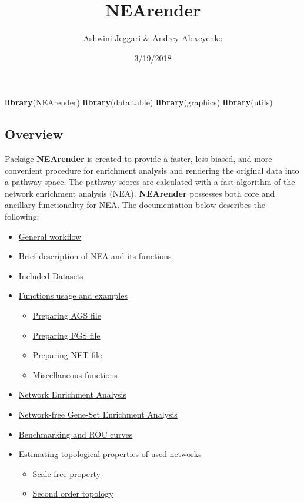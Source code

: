 \documentclass[]{article}
\title{NEArender}
\author{Ashwini Jeggari \& Andrey Alexeyenko}
\date{3/19/2018}
\newenvironment{Shaded}{\begin{snugshade}}{\end{snugshade}}
\newcommand{\KeywordTok}[1]{\textcolor[rgb]{0.13,0.29,0.53}{\textbf{#1}}}
\newcommand{\NormalTok}[1]{#1}
\providecommand{\tightlist}{%
  \setlength{\itemsep}{0pt}\setlength{\parskip}{0pt}}
\begin{document}
\maketitle

\begin{Shaded}
\begin{Highlighting}[]
\KeywordTok{library}\NormalTok{(NEArender)}
\KeywordTok{library}\NormalTok{(data.table)}
\KeywordTok{library}\NormalTok{(graphics)}
\KeywordTok{library}\NormalTok{(utils)}
\end{Highlighting}
\end{Shaded}

\subsection{Overview}\label{overview}

Package \textbf{NEArender} is created to provide a faster, less biased,
and more convenient procedure for enrichment analysis and rendering the
original data into a pathway space. The pathway scores are calculated
with a fast algorithm of the network enrichment analysis (NEA).
\textbf{NEArender} possesses both core and ancillary functionality for
NEA. The documentation below describes the following:

\begin{itemize}
\item
  \protect\hyperlink{test1}{General workflow}
\item
  \protect\hyperlink{test3}{Brief description of NEA and its functions}
\item
  \protect\hyperlink{test2}{Included Datasets}
\item
  \protect\hyperlink{test4}{Functions usage and examples}

  \begin{itemize}
  \tightlist
  \item
    \protect\hyperlink{ags}{Preparing AGS file}
  \item
    \protect\hyperlink{fgs}{Preparing FGS file}
  \item
    \protect\hyperlink{net}{Preparing NET file}
  \item
    \protect\hyperlink{misc}{Miscellaneous functions}
  \end{itemize}
\item
  \protect\hyperlink{nea-run}{Network Enrichment Analysis}
\item
  \protect\hyperlink{gsea-run}{Network-free Gene-Set Enrichment
  Analysis}
\item
  \protect\hyperlink{bor}{Benchmarking and ROC curves}
\item
  \protect\hyperlink{connect}{Estimating topological properties of used
  networks}

  \begin{itemize}
  \tightlist
  \item
    \protect\hyperlink{sfp}{Scale-free property}
  \item
    \protect\hyperlink{sot}{Second order topology}
  \end{itemize}
\end{itemize}
\end{document}
